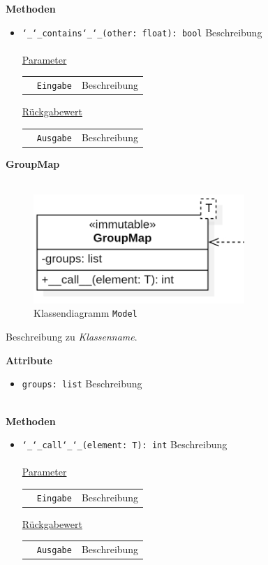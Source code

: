 \documentclass{article}
\begin{document}
\textbf{{Methoden}}
\begin{itemize}
\item \texttt{\char`_\char`_contains\char`_\char`_(other: float): bool} \newline Beschreibung
\\\\
\underline{{Parameter}}

\begin{tabular}{lll}
 & \texttt{Eingabe} & Beschreibung \\
\end{tabular}

\underline{{Rückgabewert}}

\begin{tabular}{lll}
 & \texttt{Ausgabe} & Beschreibung \\
\end{tabular}
\end{itemize}


\newpage
\textbf{\large{GroupMap}}\\\\
\begin{figure}[H]%
    \centering
    \includegraphics[width=8cm]{entwurf/Entwurf_dokument/img/cls/model/GroupMap.png}
    \caption{Klassendiagramm \texttt{Model}}
\end{figure}

Beschreibung zu \textit{Klassenname}.
\newline \newline

\textbf{Attribute}
\begin{itemize}
\item \texttt{groups: list} \newline Beschreibung
\\\\
\end{itemize}

\textbf{Methoden}
\begin{itemize}
\item \texttt{\char`_\char`_call\char`_\char`_(element: T): int} \newline Beschreibung
\\\\
\underline{{Parameter}}

\begin{tabular}{lll}
 & \texttt{Eingabe} & Beschreibung \\
\end{tabular}

\underline{Rückgabewert}

\begin{tabular}{lll}
 & \texttt{Ausgabe} & Beschreibung \\
\end{tabular}
\end{itemize}
\end{document}
